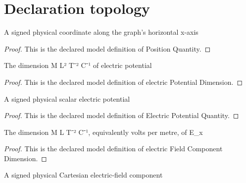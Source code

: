 \section{Declaration topology}
\begin{definition}
  \label{def:physics:phyx-mini-0868:phyxminiproblems-problemphyxmini0868-positionquantity}
  A signed physical coordinate along the graph's horizontal x-axis
\end{definition}
\begin{proof}
  This is the declared model definition of Position Quantity.
\end{proof}
\begin{definition}
  \label{def:physics:phyx-mini-0868:phyxminiproblems-problemphyxmini0868-electricpotentialdimension}
  The dimension M L² T⁻² C⁻¹ of electric potential
\end{definition}
\begin{proof}
  This is the declared model definition of electric Potential Dimension.
\end{proof}
\begin{definition}
  \label{def:physics:phyx-mini-0868:phyxminiproblems-problemphyxmini0868-electricpotentialquantity}
  A signed physical scalar electric potential
\end{definition}
\begin{proof}
  This is the declared model definition of Electric Potential Quantity.
\end{proof}
\begin{definition}
  \label{def:physics:phyx-mini-0868:phyxminiproblems-problemphyxmini0868-electricfieldcomponentdimension}
  The dimension M L T⁻² C⁻¹, equivalently volts per metre, of E\_x
\end{definition}
\begin{proof}
  This is the declared model definition of electric Field Component Dimension.
\end{proof}
\begin{definition}
  \label{def:physics:phyx-mini-0868:phyxminiproblems-problemphyxmini0868-electricfieldcomponentquantity}
  A signed physical Cartesian electric-field component
\end{definition}
